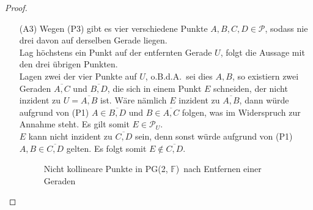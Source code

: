 \documentclass[hidelinks]{article}
\theoremstyle{plain}
\theoremstyle{definition}
\theoremstyle{rem}
\newcommand{\pgtwo}{PG(2, $\mathbb{F}$)\ }
\newcommand{\pu}{\mathcal{P}_U}
\begin{document}
\begin{sloppypar}
\begin{proof}
\begin{enumerate}
\begin{figure}[H]
\centering
 \caption{Parallelen in \pgtwo nach Entfernen einer Geraden}
\end{figure}
	\item[(A3)] Wegen (P3) gibt es vier verschiedene Punkte $A,B,C,D\in\mathcal{P}$, sodass nie drei davon auf derselben Gerade liegen.\\
		Lag höchstens ein Punkt auf der entfernten Gerade $U$, folgt die Aussage mit den drei übrigen Punkten.\\
		Lagen zwei der vier Punkte auf $U$, o.B.d.A.\ sei dies $A,B$, so existiern zwei Geraden $\overline{A,C}$ und $\overline{B,D}$, die sich in einem Punkt $E$ schneiden, der nicht inzident zu $U=\overline{A,B}$ ist.
		Wäre nämlich $E$ inzident zu $\overline{A,B}$, dann würde aufgrund von (P1) $A\in\overline{B,D}$ und $B\in\overline{A,C}$ folgen, was im Widerspruch zur Annahme steht. Es gilt somit $E\in\pu$.\\
$E$ kann nicht inzident zu $\overline{C,D}$ sein, denn sonst würde aufgrund von (P1) $A,B\in\overline{C,D}$ gelten. Es folgt somit $E\notin\overline{C,D}$.
\begin{figure}[H]
\centering
 \caption{Nicht kollineare Punkte in \pgtwo nach Entfernen einer Geraden}
\end{figure}


\end{enumerate}
\end{proof}
\end{sloppypar}
\end{document}
